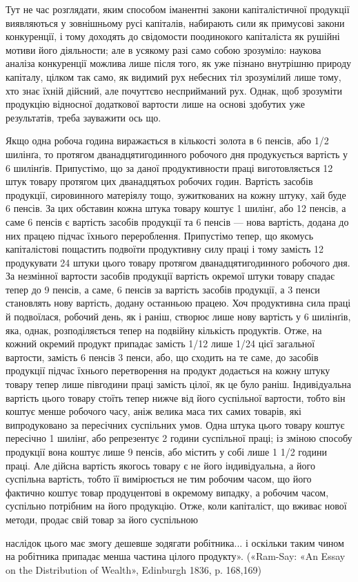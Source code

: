 Тут не час розглядати, яким способом іманентні закони капіталістичної
продукції виявляються у зовнішньому русі капіталів,
набирають сили як примусові закони конкуренції, і тому доходять
до свідомости поодинокого капіталіста як рушійні мотиви
його діяльности; але в усякому разі само собою зрозуміло: наукова
аналіза конкуренції можлива лише після того, як уже пізнано
внутрішню природу капіталу, цілком так само, як видимий рух
небесних тіл зрозумілий лише тому, хто знає їхній дійсний, але
почуттєво несприйманий рух. Однак, щоб зрозуміти продукцію
відносної додаткової вартости лише на основі здобутих уже результатів,
треба зауважити ось що.

Якщо одна робоча година виражається в кількості золота
в 6 пенсів, або 1/2 шилінґа, то протягом дванадцятигодинного
робочого дня продукується вартість у 6 шилінґів. Припустімо, що
за даної продуктивности праці виготовляється 12 штук товару
протягом цих дванадцятьох робочих годин. Вартість засобів продукції,
сировинного матеріялу тощо, зужиткованих на кожну
штуку, хай буде 6 пенсів. За цих обставин кожна штука товару
коштує 1 шилінґ, або 12 пенсів, а саме 6 пенсів є вартість засобів
продукції та 6 пенсів — нова вартість, додана до них працею
підчас їхнього перероблення. Припустімо тепер, що якомусь
капіталістові пощастить подвоїти продуктивну силу праці і тому
замість 12 продукувати 24 штуки цього товару протягом дванадцятигодинного
робочого дня. За незмінної вартости засобів
продукції вартість окремої штуки товару спадає тепер до 9 пенсів,
 а саме, 6 пенсів за вартість засобів продукції, а 3 пенси становлять
нову вартість, додану останньою працею. Хоч продуктивна
сила праці й подвоїлася, робочий день, як і раніш, створює
лише нову вартість у 6 шилінґів, яка, однак, розподіляється
тепер на подвійну кількість продуктів. Отже, на кожний окремий
продукт припадає замість 1/12 лише 1/24 цієї загальної вартости,
замість 6 пенсів 3 пенси, або, що сходить на те саме, до засобів
продукції підчас їхнього перетворення на продукт додається на
кожну штуку товару тепер лише півгодини праці замість цілої,
як це було раніш. Індивідуальна вартість цього товару стоїть
тепер нижче від його суспільної вартости, тобто він коштує менше
робочого часу, аніж велика маса тих самих товарів, які випродуковано
за пересічних суспільних умов. Одна штука цього товару
коштує пересічно 1 шилінґ, або репрезентує 2 години суспільної
праці; із зміною способу продукції вона коштує лише 9 пенсів,
або містить у собі лише 1 1/2 години праці. Але дійсна вартість
якогось товару є не його індивідуальна, а його суспільна вартість,
тобто її вимірюється не тим робочим часом, що його фактично
коштує товар продуцентові в окремому випадку, а робочим часом,
суспільно потрібним на його продукцію. Отже, коли капіталіст,
що вживає нової методи, продає свій товар за його суспільною

наслідок цього має змогу дешевше зодягати робітника... і оскільки таким
чином на робітника припадає менша частина цілого продукту». («Ram-Say:
«An Essay on the Distribution of Wealth», Edinburgh 1836, p. 168,169)
\parbreak{}  %
